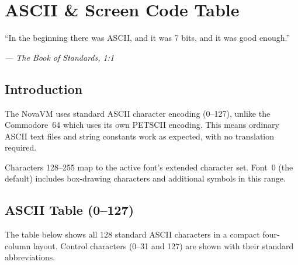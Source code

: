 \chapter{ASCII \& Screen Code Table}

\epigraph{``In the beginning there was ASCII, and it was 7 bits, and it was
good enough.''}{\textit{--- The Book of Standards, 1:1}}

\section*{Introduction}

The NovaVM uses standard ASCII character encoding (0--127), unlike the
Commodore~64 which uses its own PETSCII encoding.  This means ordinary ASCII
text files and string constants work as expected, with no translation required.

Characters 128--255 map to the active font's extended character set.  Font~0
(the default) includes box-drawing characters and additional symbols in this
range.


\section{ASCII Table (0--127)}
\label{sec:ascii-table}

The table below shows all 128 standard ASCII characters in a compact four-column
layout.  Control characters (0--31 and 127) are shown with their standard
abbreviations.

